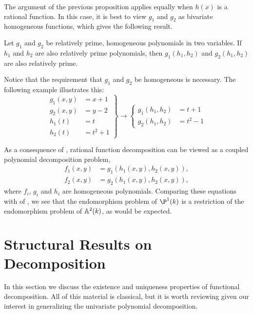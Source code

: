 The argument of the previous proposition applies equally when $h(x)$
is a rational function.  In this case, it is best to view $g_1$ and
$g_2$ as bivariate homogeneous functions, which gives the following
result.

\begin{proposition}
\label{No:GCD:Prop}
Let $g_1$ and $g_2$ be relatively prime, homogeneous polynomials in two
variables.  If $h_1$ and $h_2$ are also relatively prime polynomials, then
$g_1(h_1, h_2)$ and $g_2(h_1, h_2)$ are also relatively prime.
\end{proposition}

Notice that the requirement that $g_1$ and $g_2$ be homogeneous is
necessary.  The following example illustrates this:
\[
\left.\begin{aligned}
g_1(x,y) & = x+1 \\
g_2(x, y) & = y - 2 \\
h_1(t) & = t \\
h_2(t) & = t^2 + 1
\end{aligned}
\right\} \longrightarrow
\left\{
\begin{aligned}
g_1(h_1, h_2) & = t + 1 \\
g_2(h_1, h_2) & = t^2 - 1
\end{aligned}
\right.
\]

As a consequence of , rational function decomposition
can be viewed as a coupled polynomial decomposition problem, \viz
\[
\begin{aligned}
f_1(x, y) & = g_1(h_1 (x, y), h_2(x, y)), \\
f_2(x, y) & = g_2(h_1 (x, y), h_2(x, y)),
\end{aligned}
\]
where $f_i$, $g_i$ and $h_i$ are homogeneous
polynomials.  Comparing these equations with
 of , we see
that the endomorphism problem of $\P^1(k)$ is a restriction of the
endomorphism problem of $\mathbb{A}^2(k)$, as would be expected.

\section{Structural Results on Decomposition}
\label{Structural:Results:Sec}

In this section we discuss the existence and uniqueness properties of
functional decomposition.  All of this material is classical, but it
is worth reviewing given our interest in generalizing the univariate
polynomial decomposition.

